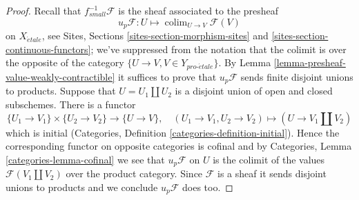 \documentclass[10pt,a4paper]{amsart}
\theoremstyle{plain}
\theoremstyle{definition}
\theoremstyle{remark}
\numberwithin{equation}{subsection}
\def\colim{\mathop{\mathrm{colim}}\nolimits}
\def\proetale{{pro\text{-}\acute{e}tale}}
\def\etale{{\acute{e}tale}}
\begin{document}
\begin{proof}
Recall that $f_{small}^{-1}\mathcal{F}$ is the sheaf associated to the
presheaf
$$
u_p\mathcal{F} : U \mapsto \colim_{U \to V} \mathcal{F}(V)
$$
on $X_\etale$, see Sites, Sections \ref{sites-section-morphism-sites} and
\ref{sites-section-continuous-functors}; we've suppressed from the notation
that the colimit is over the opposite of the category
$\{U \to V, V \in Y_\proetale\}$. By
Lemma \ref{lemma-presheaf-value-weakly-contractible}
it suffices to prove that $u_p\mathcal{F}$ sends finite disjoint unions
to products.
Suppose that $U = U_1 \amalg U_2$ is a disjoint union of open and closed
subschemes. There is a functor
$$
\{U_1 \to V_1\} \times \{U_2 \to V_2\} \longrightarrow
\{U \to V\},\quad
(U_1 \to V_1, U_2 \to V_2) \longmapsto (U \to V_1 \amalg V_2)
$$
which is initial (Categories, Definition \ref{categories-definition-initial}).
Hence the corresponding functor on opposite categories is cofinal and
by Categories, Lemma \ref{categories-lemma-cofinal} we see
that $u_p\mathcal{F}$ on $U$ is the colimit of the values
$\mathcal{F}(V_1 \amalg V_2)$ over the product category.
Since $\mathcal{F}$ is a sheaf it sends disjoint unions to products and
we conclude $u_p\mathcal{F}$ does too.
\end{proof}
\end{document}
